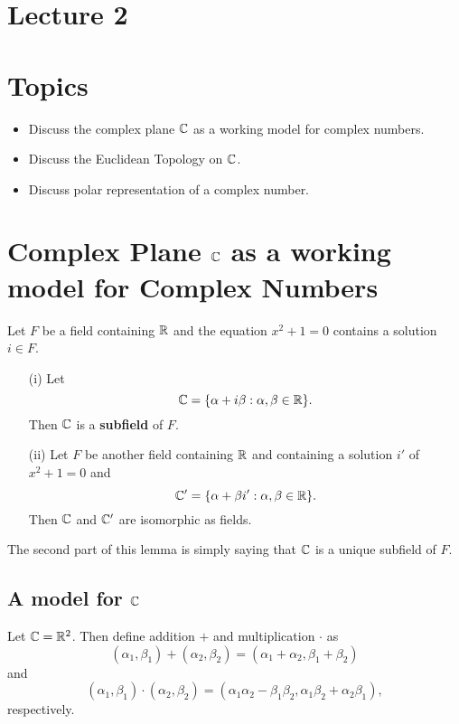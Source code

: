 \documentclass[a4paper]{article}
\begin{document}
\section{Lecture 2}

\section{Topics}

\begin{itemize}
    \item Discuss the complex plane \( \mathbb{C}  \) as a working model for complex numbers.
    \item Discuss the Euclidean Topology on \( \mathbb{C}  \).
    \item Discuss polar representation of a complex number.
\end{itemize}

\section{Complex Plane \( \mathbb{C}  \) as a working model for Complex Numbers}
\begin{lemma}
  Let \( F  \) be a field containing \( \mathbb{R}  \) and the equation \( x^{2} + 1  =0 \) contains a solution \( i \in F  \).
\begin{enumerate}
    \item[(i)] Let   
  \[  \mathbb{C} = \{ \alpha + i \beta : \alpha, \beta \in \mathbb{R}  \}. \]
  Then \( \mathbb{C}  \) is a \textbf{subfield} of \( F  \).
    \item[(ii)] Let \( F  \) be another field containing \( \mathbb{R}  \) and containing a solution \( i' \) of \( x^{2} + 1 = 0   \) and
        \[  \mathbb{C}' = \{ \alpha + \beta i' : \alpha, \beta \in \mathbb{R}  \}.  \]
        Then \( \mathbb{C}  \) and \( \mathbb{C}' \) are isomorphic as fields.
\end{enumerate}
\end{lemma}

The second part of this lemma is simply saying that \( \mathbb{C}  \) is a unique subfield of \( F  \).

\subsection{A model for \( \mathbb{C}  \)}

Let \( \mathbb{C} = \mathbb{R}^{2} \). Then define addition \( +  \) and multiplication \( \cdot \) as 
\[  ({\alpha}_{1}, {\beta}_{1}) + ({\alpha}_{2}, {\beta}_{2}) = ({\alpha}_{1} + {\alpha}_{2}, {\beta}_{1} + {\beta}_{2}) \]
and 
\[  ({\alpha}_{1}, {\beta}_{1}) \cdot ({\alpha}_{2}, {\beta}_{2}) = ({\alpha}_{1} {\alpha}_{2} - {\beta}_{1} {\beta}_{2} , {\alpha}_{1} {\beta}_{2} + {\alpha}_{2} {\beta}_{1}), \]
respectively.
\end{document}
